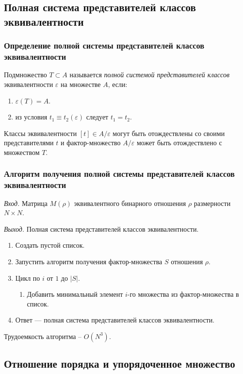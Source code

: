\documentclass[bachelor, och, labwork]{shiza}
\begin{document}
\subsection{Полная система представителей классов эквивалентности}
\subsubsection{Определение полной системы представителей классов эквивалентности}
Подмножество $T\subset A$ называется \textit{полной системой представителей классов}
эквивалентности $\varepsilon$ на множестве $A$, если:
\begin{center}
    \begin{enumerate}
        \item $\varepsilon(T)=A$.
        \item из условия $t_1\equiv t_2(\varepsilon)$ следует $t_1=t_2$.
    \end{enumerate}
\end{center}
Классы эквивалентности $[t]\in A/\varepsilon$ могут быть отождествлены со своими
представителями $t$ и фактор-множество $A/\varepsilon$ может быть
отождествлено с множеством $T$.

\subsubsection{Алгоритм получения полной системы представителей классов эквивалентности}
\textit{Вход.} Матрица $M(\rho)$ эквивалентного бинарного отношения $\rho$ размерности
$N \times N$.

\textit{Выход.} Полная система представителей классов эквивалентности.
\begin{enumerate}
    \item Создать пустой список.
    \item Запустить алгоритм получения фактор-множества $S$ отношения $\rho$.
    \item Цикл по $i$ от $1$ до $|S|$.
        \begin{enumerate} \item Добавить минимальный элемент $i$-го множества из фактор-множества в список.\end{enumerate}
    \item Ответ --- полная система представителей классов эквивалентности.
\end{enumerate}
Трудоемкость алгоритма -- $O(N^3)$.

\subsection{Отношение порядка и упорядоченное множество}
\end{document}

